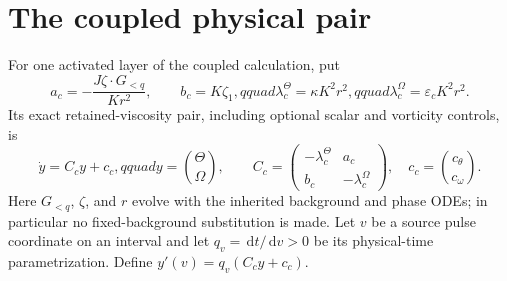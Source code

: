 \documentclass[11pt]{article}
\newcommand{\dd}{\,\mathrm d}
\begin{document}
\section{The coupled physical pair}
For one activated layer of the coupled calculation, put
\begin{equation}
 a_c=-\frac{J\zeta\cdot G_{<q}}{Kr^2},\qquad b_c=K\zeta_1,qquad
 \lambda_c^\Theta=\kappa K^2r^2,qquad \lambda_c^\Omega=\varepsilon_c K^2r^2.
\end{equation}
Its exact retained-viscosity pair, including optional scalar and vorticity
controls, is
\begin{equation}
 \dot y=C_cy+c_c,qquad y=\binom{\Theta}{\Omega},\qquad
 C_c=\begin{pmatrix}-\lambda_c^\Theta&a_c\\b_c&-\lambda_c^\Omega\end{pmatrix},\quad
 c_c=\binom{c_\theta}{c_\omega}.
 \label{eq:coupledpair}
\end{equation}
Here $G_{<q}$, $\zeta$, and $r$ evolve with the inherited background and phase
ODEs; in particular no fixed-background substitution is made.  Let $v$ be a
source pulse coordinate on an interval and let $q_v=\dd t/\dd v>0$ be its
physical-time parametrization.  Define $y'(v)=q_v(C_cy+c_c)$.
\end{document}
